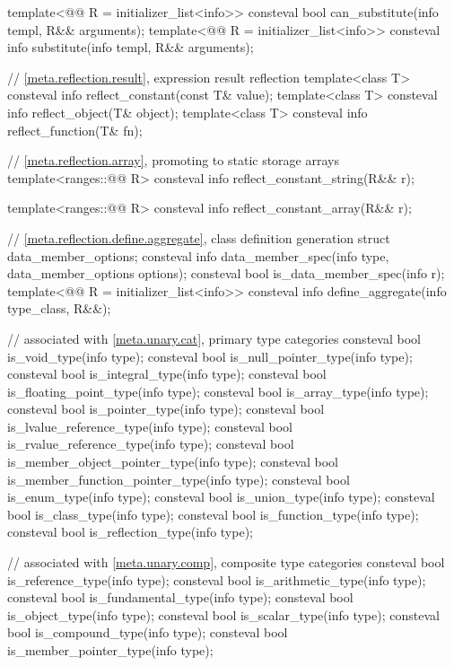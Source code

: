 \begin{codeblock}
{  template<@@ R = initializer_list<info>>
    consteval bool can_substitute(info templ, R&& arguments);
  template<@@ R = initializer_list<info>>
    consteval info substitute(info templ, R&& arguments);

  // \ref{meta.reflection.result}, expression result reflection
  template<class T>
    consteval info reflect_constant(const T& value);
  template<class T>
    consteval info reflect_object(T& object);
  template<class T>
    consteval info reflect_function(T& fn);

  // \ref{meta.reflection.array}, promoting to static storage arrays
  template<ranges::@@ R>
    consteval info reflect_constant_string(R&& r);

  template<ranges::@@ R>
    consteval info reflect_constant_array(R&& r);

  // \ref{meta.reflection.define.aggregate}, class definition generation
  struct data_member_options;
  consteval info data_member_spec(info type, data_member_options options);
  consteval bool is_data_member_spec(info r);
  template<@@ R = initializer_list<info>>
    consteval info define_aggregate(info type_class, R&&);

  // associated with \ref{meta.unary.cat}, primary type categories
  consteval bool is_void_type(info type);
  consteval bool is_null_pointer_type(info type);
  consteval bool is_integral_type(info type);
  consteval bool is_floating_point_type(info type);
  consteval bool is_array_type(info type);
  consteval bool is_pointer_type(info type);
  consteval bool is_lvalue_reference_type(info type);
  consteval bool is_rvalue_reference_type(info type);
  consteval bool is_member_object_pointer_type(info type);
  consteval bool is_member_function_pointer_type(info type);
  consteval bool is_enum_type(info type);
  consteval bool is_union_type(info type);
  consteval bool is_class_type(info type);
  consteval bool is_function_type(info type);
  consteval bool is_reflection_type(info type);

  // associated with \ref{meta.unary.comp}, composite type categories
  consteval bool is_reference_type(info type);
  consteval bool is_arithmetic_type(info type);
  consteval bool is_fundamental_type(info type);
  consteval bool is_object_type(info type);
  consteval bool is_scalar_type(info type);
  consteval bool is_compound_type(info type);
  consteval bool is_member_pointer_type(info type);

}
\end{codeblock}
